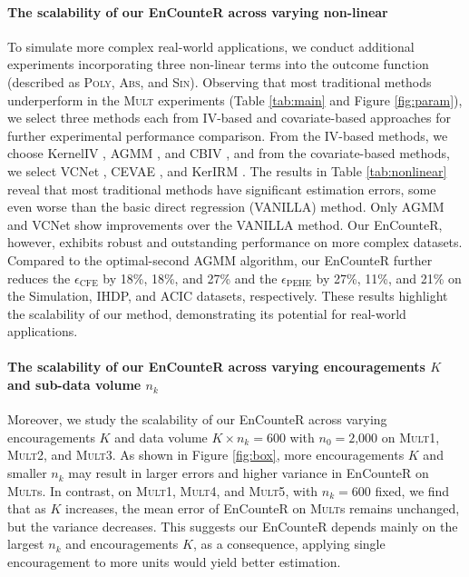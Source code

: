 \documentclass[journal]{IEEEtran}
\begin{document}
\paragraph{The scalability of our EnCounteR across varying non-linear}
To simulate more complex real-world applications, we conduct additional experiments incorporating three non-linear terms into the outcome function (described as \textsc{Poly}, \textsc{Abs}, and \textsc{Sin}). 
Observing that most traditional methods underperform in the \textsc{Mult} experiments (Table \ref{tab:main} and Figure \ref{fig:param}), we select three methods each from IV-based and covariate-based approaches for further experimental performance comparison. From the IV-based methods, we choose KernelIV \cite{singh2019kernel}, AGMM \cite{lewis2020agmm}, and CBIV \cite{wu2022instrumental}, and from the covariate-based methods, we select VCNet \cite{nie2021vcnet}, CEVAE \cite{louizos2017causal}, and KerIRM \cite{arjovsky2019invariant}. The results in Table \ref{tab:nonlinear} reveal that most traditional methods have significant estimation errors, some even worse than the basic direct regression (VANILLA) method. Only AGMM and VCNet show improvements over the VANILLA method. Our EnCounteR, however, exhibits robust and outstanding performance on more complex datasets. Compared to the optimal-second AGMM algorithm, our EnCounteR further reduces the $\epsilon_{\text{CFE}}$ by 18\%, 18\%, and 27\% and the $\epsilon_{\text{PEHE}}$ by 27\%, 11\%, and 21\% on the Simulation, IHDP, and ACIC datasets, respectively. These results highlight the scalability of our method, demonstrating its potential for real-world applications.


\paragraph{The scalability of our EnCounteR across varying encouragements $K$ and sub-data volume $n_k$} 
Moreover, we study the scalability of our EnCounteR across varying encouragements $K$ and data volume $K \times n_k=600$ with $n_0=\text{2,000}$ on \textsc{Mult1}, \textsc{Mult2}, and \textsc{Mult3}. As shown in Figure \ref{fig:box}, more encouragements $K$ and smaller $n_k$ may result in larger errors and higher variance in EnCounteR on \textsc{Mult}s. In contrast, on \textsc{Mult1}, \textsc{Mult4}, and \textsc{Mult5}, with $n_k=\text{600}$ fixed, we find that as $K$ increases, the mean error of EnCounteR on \textsc{Mult}s remains unchanged, but the variance decreases. This suggests our EnCounteR depends mainly on the largest $n_k$ and encouragements $K$, as a consequence, applying single encouragement to more units would yield better estimation.
\end{document}
